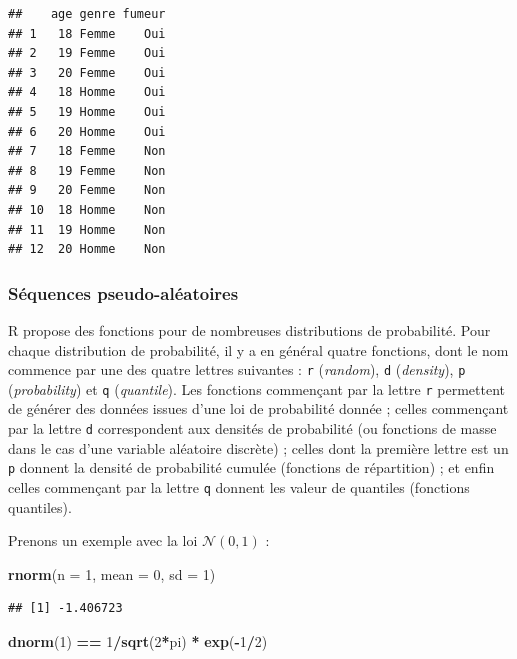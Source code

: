 \documentclass[
  11pt,
]{book}
\newenvironment{Shaded}{\begin{snugshade}}{\end{snugshade}}
\newcommand{\DataTypeTok}[1]{\textcolor[rgb]{0.13,0.29,0.53}{#1}}
\newcommand{\DecValTok}[1]{\textcolor[rgb]{0.00,0.00,0.81}{#1}}
\newcommand{\KeywordTok}[1]{\textcolor[rgb]{0.13,0.29,0.53}{\textbf{#1}}}
\newcommand{\NormalTok}[1]{#1}
\newcommand{\OperatorTok}[1]{\textcolor[rgb]{0.81,0.36,0.00}{\textbf{#1}}}
\newcommand{\StringTok}[1]{\textcolor[rgb]{0.31,0.60,0.02}{#1}}
\numberwithin{equation}{section}
\numberwithin{countremarque}{section}
\begin{document}
\begin{lstlisting}
##    age genre fumeur
## 1   18 Femme    Oui
## 2   19 Femme    Oui
## 3   20 Femme    Oui
## 4   18 Homme    Oui
## 5   19 Homme    Oui
## 6   20 Homme    Oui
## 7   18 Femme    Non
## 8   19 Femme    Non
## 9   20 Femme    Non
## 10  18 Homme    Non
## 11  19 Homme    Non
## 12  20 Homme    Non
\end{lstlisting}

\hypertarget{suxe9quences-pseudo-aluxe9atoires}{%
\subsubsection{Séquences pseudo-aléatoires}\label{suxe9quences-pseudo-aluxe9atoires}}

R propose des fonctions pour de nombreuses distributions de probabilité. Pour chaque distribution de probabilité, il y a en général quatre fonctions, dont le nom commence par une des quatre lettres suivantes : \texttt{r} (\emph{random}), \texttt{d} (\emph{density}), \texttt{p} (\emph{probability}) et \texttt{q} (\emph{quantile}). Les fonctions commençant par la lettre \texttt{r} permettent de générer des données issues d'une loi de probabilité donnée ; celles commençant par la lettre \texttt{d} correspondent aux densités de probabilité (ou fonctions de masse dans le cas d'une variable aléatoire discrète) ; celles dont la première lettre est un \texttt{p} donnent la densité de probabilité cumulée (fonctions de répartition) ; et enfin celles commençant par la lettre \texttt{q} donnent les valeur de quantiles (fonctions quantiles).

Prenons un exemple avec la loi \(\mathcal{N}(0,1)\) :

\begin{Shaded}
\begin{Highlighting}[]
\KeywordTok{rnorm}\NormalTok{(}\DataTypeTok{n =} \DecValTok{1}\NormalTok{, }\DataTypeTok{mean =} \DecValTok{0}\NormalTok{, }\DataTypeTok{sd =} \DecValTok{1}\NormalTok{)}
\end{Highlighting}
\end{Shaded}

\begin{lstlisting}
## [1] -1.406723
\end{lstlisting}

\begin{Shaded}
\begin{Highlighting}[]
\KeywordTok{dnorm}\NormalTok{(}\DecValTok{1}\NormalTok{) }\OperatorTok{==}\StringTok{ }\DecValTok{1}\OperatorTok{/}\KeywordTok{sqrt}\NormalTok{(}\DecValTok{2}\OperatorTok{*}\NormalTok{pi) }\OperatorTok{*}\StringTok{ }\KeywordTok{exp}\NormalTok{(}\OperatorTok{{-}}\DecValTok{1}\OperatorTok{/}\DecValTok{2}\NormalTok{)}
\end{Highlighting}
\end{Shaded}
\end{document}
